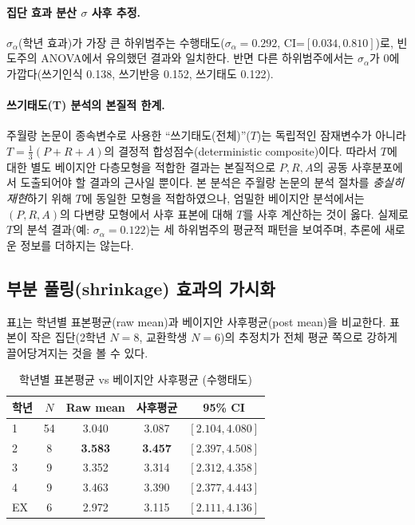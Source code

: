 \documentclass[11pt]{article}
\begin{document}
\paragraph{집단 효과 분산 $\sigma$ 사후 추정.}
$\sigma_\alpha$(학년 효과)가 가장 큰 하위범주는 수행태도($\sigma_\alpha=0.292$, CI=$[0.034, 0.810]$)로, 빈도주의 ANOVA에서 유의했던 결과와 일치한다. 반면 다른 하위범주에서는 $\sigma_\alpha$가 0에 가깝다(쓰기인식 0.138, 쓰기반응 0.152, 쓰기태도 0.122).

\paragraph{쓰기태도(T) 분석의 본질적 한계.}
주월랑 논문이 종속변수로 사용한 ``쓰기태도(전체)''($T$)는 독립적인 잠재변수가 아니라 $T = \tfrac{1}{3}(P + R + A)$의 결정적 합성점수(deterministic composite)이다. 따라서 $T$에 대한 별도 베이지안 다층모형을 적합한 결과는 본질적으로 $P, R, A$의 공동 사후분포에서 도출되어야 할 결과의 근사일 뿐이다. 본 분석은 주월랑 논문의 분석 절차를 \emph{충실히 재현}하기 위해 $T$에 동일한 모형을 적합하였으나, 엄밀한 베이지안 분석에서는 $(P, R, A)$의 다변량 모형에서 사후 표본에 대해 $T$를 사후 계산하는 것이 옳다. 실제로 $T$의 분석 결과(예: $\sigma_\alpha=0.122$)는 세 하위범주의 평균적 패턴을 보여주며, 추론에 새로운 정보를 더하지는 않는다.

\subsection{부분 풀링(shrinkage) 효과의 가시화}

표\ref{tab:shrink}는 학년별 표본평균(raw mean)과 베이지안 사후평균(post mean)을 비교한다. 표본이 작은 집단(2학년 $N=8$, 교환학생 $N=6$)의 추정치가 전체 평균 쪽으로 강하게 끌어당겨지는 것을 볼 수 있다.

\begin{table}[h]
\centering
\caption{학년별 표본평균 vs 베이지안 사후평균 (수행태도)}\label{tab:shrink}
\begin{tabular}{lcccc}
\toprule
학년 & $N$ & Raw mean & 사후평균 & 95\% CI \\
\midrule
1 & 54 & 3.040 & 3.087 & $[2.104, 4.080]$ \\
2 &  8 & \textbf{3.583} & \textbf{3.457} & $[2.397, 4.508]$ \\
3 &  9 & 3.352 & 3.314 & $[2.312, 4.358]$ \\
4 &  9 & 3.463 & 3.390 & $[2.377, 4.443]$ \\
EX &  6 & 2.972 & 3.115 & $[2.111, 4.136]$ \\
\bottomrule
\end{tabular}
\end{table}
\end{document}
